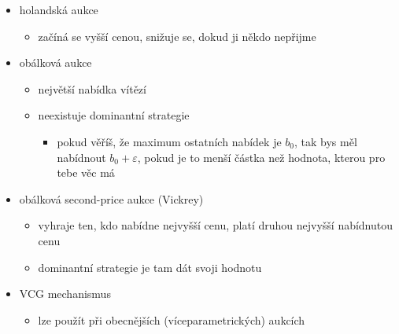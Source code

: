 \begin{itemize}
\begin{itemize}
\begin{itemize}
\begin{itemize}
\item dominantní strategie
\end{itemize}
\end{itemize}
\item holandská aukce
\begin{itemize}
\item začíná se vyšší cenou, snižuje se, dokud ji někdo nepřijme
\end{itemize}
\item obálková aukce
\begin{itemize}
\item největší nabídka vítězí
\item neexistuje dominantní strategie
\begin{itemize}
\item pokud věříš, že maximum ostatních nabídek je $b_0$, tak bys měl nabídnout $b_0+\varepsilon$, pokud je to menší částka než hodnota, kterou pro tebe věc má
\end{itemize}
\end{itemize}
\item obálková second-price aukce (Vickrey)
\begin{itemize}
\item vyhraje ten, kdo nabídne nejvyšší cenu, platí druhou nejvyšší nabídnutou cenu
\item dominantní strategie je tam dát svoji hodnotu
\end{itemize}
\item VCG mechanismus
\begin{itemize}
\item lze použít při obecnějších (víceparametrických) aukcích
\end{itemize}
\end{itemize}
\end{itemize}
